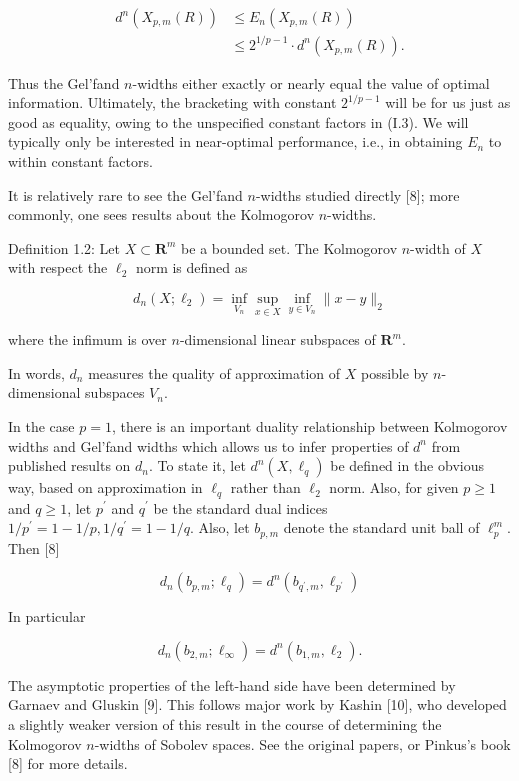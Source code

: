 \documentclass[10pt]{article}
\begin{document}
\begin{align*}
d^{n}\left(X_{p, m}(R)\right) & \leq E_{n}\left(X_{p, m}(R)\right)  \tag{I.4}\\
& \leq 2^{1 / p-1} \cdot d^{n}\left(X_{p, m}(R)\right) . \tag{I.5}
\end{align*}


Thus the Gel'fand $n$-widths either exactly or nearly equal the value of optimal information. Ultimately, the bracketing with constant $2^{1 / p-1}$ will be for us just as good as equality, owing to the unspecified constant factors in (I.3). We will typically only be interested in near-optimal performance, i.e., in obtaining $E_{n}$ to within constant factors.

It is relatively rare to see the Gel'fand $n$-widths studied directly [8]; more commonly, one sees results about the Kolmogorov $n$-widths.

Definition 1.2: Let $X \subset \boldsymbol{R}^{m}$ be a bounded set. The Kolmogorov $n$-width of $X$ with respect the $\ell_{2}$ norm is defined as

$$
d_{n}\left(X ; \ell_{2}\right)=\inf _{V_{n}} \sup _{x \in X} \inf _{y \in V_{n}}\|x-y\|_{2}
$$

where the infimum is over $n$-dimensional linear subspaces of $\boldsymbol{R}^{m}$.

In words, $d_{n}$ measures the quality of approximation of $X$ possible by $n$-dimensional subspaces $V_{n}$.

In the case $p=1$, there is an important duality relationship between Kolmogorov widths and Gel'fand widths which allows us to infer properties of $d^{n}$ from published results on $d_{n}$. To state it, let $d^{n}\left(X, \ell_{q}\right)$ be defined in the obvious way, based on approximation in $\ell_{q}$ rather than $\ell_{2}$ norm. Also, for given $p \geq 1$ and $q \geq 1$, let $p^{\prime}$ and $q^{\prime}$ be the standard dual indices $1 / p^{\prime}= 1-1 / p, 1 / q^{\prime}=1-1 / q$. Also, let $b_{p, m}$ denote the standard unit ball of $\ell_{p}^{m}$. Then [8]


\begin{equation*}
d_{n}\left(b_{p, m} ; \ell_{q}\right)=d^{n}\left(b_{q^{\prime}, m}, \ell_{p^{\prime}}\right) \tag{I.6}
\end{equation*}


In particular

$$
d_{n}\left(b_{2, m} ; \ell_{\infty}\right)=d^{n}\left(b_{1, m}, \ell_{2}\right) .
$$

The asymptotic properties of the left-hand side have been determined by Garnaev and Gluskin [9]. This follows major work by Kashin [10], who developed a slightly weaker version of this result in the course of determining the Kolmogorov $n$-widths of Sobolev spaces. See the original papers, or Pinkus's book [8] for more details.
\end{document}
